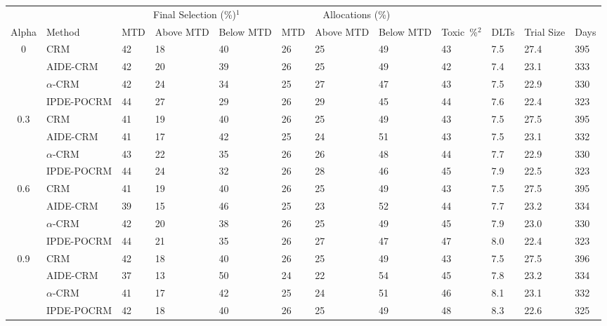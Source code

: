\begin{tabular*}{\textwidth}{@{\extracolsep\fill}clllllllllll@{\extracolsep\fill}}
\toprule
&  & \multicolumn{3}{c}{Final Selection (\%)$^1$} & \multicolumn{3}{c}{Allocations (\%)} & &  &  &  \\
\multirow{2}{2em}{Alpha} & \multirow{2}{2em}{Method} & \multirow{2}{2em}{MTD} & \multirow{2}{2em}{Above MTD} & \multirow{2}{2em}{Below MTD} & \multirow{2}{2em}{MTD} & \multirow{2}{2em}{Above MTD} & \multirow{2}{2em}{Below MTD} & \multirow{2}{2em}{Toxic~\%$^2$} & \multirow{2}{2em}{DLTs} & \multirow{2}{2em}{Trial Size} & \multirow{2}{2em}{Days}  \\ \\ 
\midrule
\multirow{4}{2em}{0} & CRM & 42 & 18 & 40 & 26 & 25 & 49 & 43 & 7.5 & 27.4 & 395\\
 & AIDE-CRM & 42 & 20 & 39 & 26 & 25 & 49 & 42 & 7.4 & 23.1 & 333\\
 & $\alpha$-CRM & 42 & 24 & 34 & 25 & 27 & 47 & 43 & 7.5 & 22.9 & 330\\
 & IPDE-POCRM & 44 & 27 & 29 & 26 & 29 & 45 & 44 & 7.6 & 22.4 & 323\\
\midrule
\multirow{4}{2em}{0.3} & CRM & 41 & 19 & 40 & 26 & 25 & 49 & 43 & 7.5 & 27.5 & 395\\
 & AIDE-CRM & 41 & 17 & 42 & 25 & 24 & 51 & 43 & 7.5 & 23.1 & 332\\
 & $\alpha$-CRM & 43 & 22 & 35 & 26 & 26 & 48 & 44 & 7.7 & 22.9 & 330\\
 & IPDE-POCRM & 44 & 24 & 32 & 26 & 28 & 46 & 45 & 7.9 & 22.5 & 323\\
\midrule
\multirow{4}{2em}{0.6} & CRM & 41 & 19 & 40 & 26 & 25 & 49 & 43 & 7.5 & 27.5 & 395\\
 & AIDE-CRM & 39 & 15 & 46 & 25 & 23 & 52 & 44 & 7.7 & 23.2 & 334\\
 & $\alpha$-CRM & 42 & 20 & 38 & 26 & 25 & 49 & 45 & 7.9 & 23.0 & 330\\
 & IPDE-POCRM & 44 & 21 & 35 & 26 & 27 & 47 & 47 & 8.0 & 22.4 & 323\\
\midrule
\multirow{4}{2em}{0.9} & CRM & 42 & 18 & 40 & 26 & 25 & 49 & 43 & 7.5 & 27.5 & 396\\
 & AIDE-CRM & 37 & 13 & 50 & 24 & 22 & 54 & 45 & 7.8 & 23.2 & 334\\
 & $\alpha$-CRM & 41 & 17 & 42 & 25 & 24 & 51 & 46 & 8.1 & 23.1 & 332\\
 & IPDE-POCRM & 42 & 18 & 40 & 26 & 25 & 49 & 48 & 8.3 & 22.6 & 325\\
\bottomrule
\end{tabular*}
